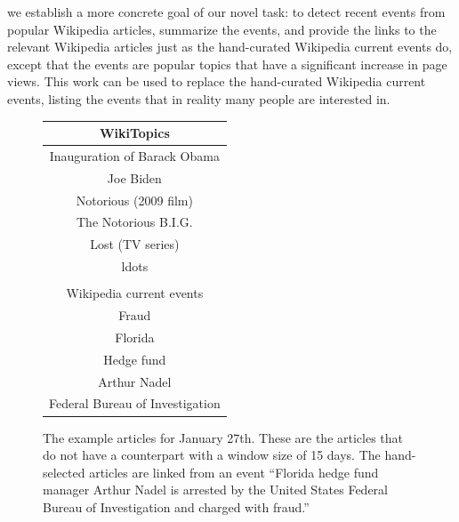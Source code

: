 \documentclass[11pt]{article}
\newcommand{\war}[1]{{\sf\small #1}}
\begin{document}
we establish a more concrete goal of our novel task:
to detect recent events from popular Wikipedia articles,
summarize the events, and provide the links to the relevant Wikipedia articles
just as the hand-curated Wikipedia current events do,
except that the events are popular topics that have a significant increase in
page views. This work can be used to replace the hand-curated Wikipedia current events,
listing the events that in reality many people are interested in.

\begin{figure}
\centering
\begin{tabular}{c}
WikiTopics \\
\hline
\war{Inauguration of Barack Obama} \\
\war{Joe Biden} \\
\war{Notorious (2009 film)} \\
\war{The Notorious B.I.G.} \\
\war{Lost (TV series)} \\
ldots \\
\\
Wikipedia current events \\
\hline
\war{Fraud} \\
\war{Florida} \\
\war{Hedge fund} \\
\war{Arthur Nadel} \\
\war{Federal Bureau of Investigation} \\
\end{tabular}
\caption{ The example articles for January 27th. These are the articles that do not have a counterpart with a window size of 15 days. The hand-selected articles are linked from an event ``Florida hedge fund manager Arthur Nadel is arrested by the United States Federal Bureau of Investigation and charged with fraud.'' \\ }
\label{fig:comparison-articles}
\end{figure}

\end{document}
